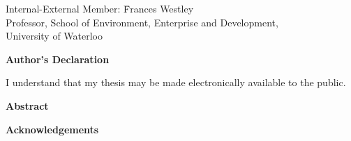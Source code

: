   \noindent
  \begin{tabbing}
Internal-External Member: \=  Frances Westley \\ %
\> Professor, School of Environment, Enterprise and Development, \\
\> University of Waterloo \\
\end{tabbing}
  \bigskip


  

\cleardoublepage
{}    %

 \begin{center}\textbf{Author's Declaration}\end{center}
  
 \noindent

  \bigskip
  
  \noindent
I understand that my thesis may be made electronically available to the public.

\cleardoublepage
{}    %

\begin{center}\textbf{Abstract}\end{center}



\cleardoublepage
{}    %

\begin{center}\textbf{Acknowledgements}\end{center}

